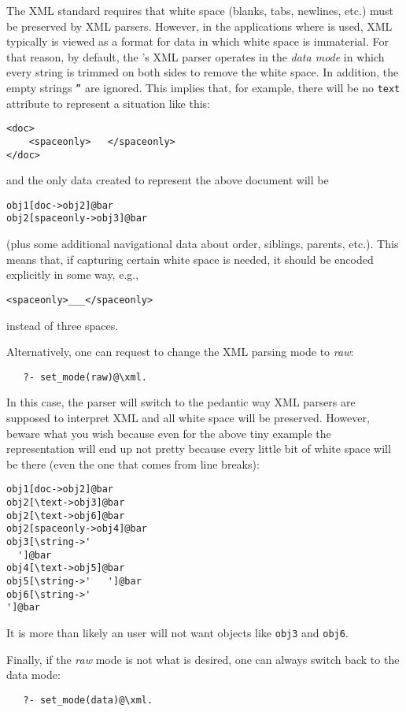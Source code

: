 The XML standard requires that white space (blanks, tabs, newlines, etc.)
must be preserved by XML parsers. However, in the applications
where \FLSYSTEM is used, XML typically is viewed as a format for data in
which white space is immaterial. For that reason, by default, the
\FLSYSTEM's XML parser operates in the \emph{data mode} in which every
string is trimmed on both sides to remove the white space. In addition, the
empty strings \texttt{''} are ignored.    
This implies that, for example, there will be no \texttt{\bs{}text}
attribute to represent a situation like this:
\begin{verbatim}
<doc>
    <spaceonly>   </spaceonly>
</doc>
\end{verbatim}
and the only data created to represent the above document will be 
\begin{verbatim}
obj1[doc->obj2]@bar
obj2[spaceonly->obj3]@bar
\end{verbatim}
(plus some additional navigational data about order, siblings, parents,
etc.).
This means that, if capturing certain white space is needed, it should be
encoded explicitly in some way, e.g., 
\begin{verbatim}
<spaceonly>___</spaceonly>
\end{verbatim}
instead of three spaces.

Alternatively, one can request to change the XML parsing mode
to \emph{raw}:
\begin{verbatim}
   ?- set_mode(raw)@\xml.
\end{verbatim}
In this case, the parser will switch to the pedantic way XML parsers are
supposed to interpret XML and all white space will be
preserved. However, beware what you wish because even for the above tiny
example the representation will end up not pretty because every little bit
of white space will be there (even the one that comes from line breaks):
\begin{verbatim}
obj1[doc->obj2]@bar
obj2[\text->obj3]@bar
obj2[\text->obj6]@bar
obj2[spaceonly->obj4]@bar
obj3[\string->'
  ']@bar
obj4[\text->obj5]@bar
obj5[\string->'   ']@bar
obj6[\string->'
']@bar
\end{verbatim}
It is more than likely an \FLSYSTEM user will not want objects like
\texttt{obj3} and \texttt{obj6}.  

Finally, if the \emph{raw} mode is not what is desired, one can always
switch back to the data mode: 
\begin{verbatim}
   ?- set_mode(data)@\xml.
\end{verbatim}

